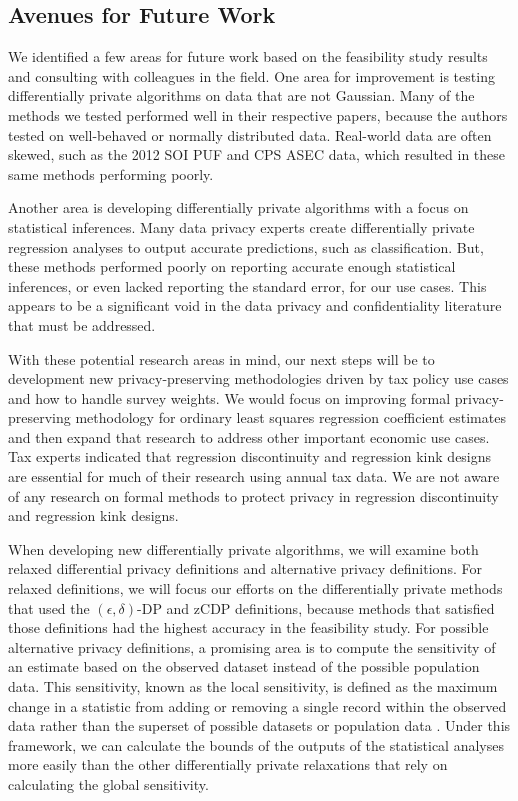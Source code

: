 \subsection{Avenues for Future Work}\label{subsec:future}
We identified a few areas for future work based on the feasibility study results and consulting with colleagues in the field. One area for improvement is testing differentially private algorithms on data that are not Gaussian. Many of the methods we tested performed well in their respective papers, because the authors tested on well-behaved or normally distributed data. Real-world data are often skewed, such as the 2012 SOI PUF and CPS ASEC data, which resulted in these same methods performing poorly.

Another area is developing differentially private algorithms with a focus on statistical inferences. Many data privacy experts create differentially private regression analyses to output accurate predictions, such as classification. But, these methods performed poorly on reporting accurate enough statistical inferences, or even lacked reporting the standard error, for our use cases. This appears to be a significant void in the data privacy and confidentiality literature that must be addressed.

With these potential research areas in mind, our next steps will be to development new privacy-preserving methodologies driven by tax policy use cases and how to handle survey weights. We would focus on improving formal privacy-preserving methodology for ordinary least squares regression coefficient estimates and then expand that research to address other important economic use cases. Tax experts indicated that regression discontinuity and regression kink designs are essential for much of their research using annual tax data. We are not aware of any research on formal methods to protect privacy in regression discontinuity and regression kink designs.

When developing new differentially private algorithms, we will examine both relaxed differential privacy definitions and alternative privacy definitions. For relaxed definitions, we will focus our efforts on the differentially private methods that used the $(\epsilon,\delta)$-DP and zCDP definitions, because methods that satisfied those definitions had the highest accuracy in the feasibility study. For possible alternative privacy definitions, a promising area is to compute the sensitivity of an estimate based on the observed dataset instead of the possible population data. This sensitivity, known as the local sensitivity, is defined as the maximum change in a statistic from adding or removing a single record within the observed data rather than the superset of possible datasets or population data \citep{nissim2007smooth}. Under this framework, we can calculate the bounds of the outputs of the statistical analyses more easily than the other differentially private relaxations that rely on calculating the global sensitivity.

